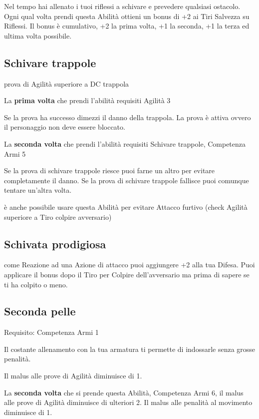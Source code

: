 \documentclass[a4paper,11pt,twoside,openany]{book}
\begin{document}
Nel tempo hai allenato i tuoi riflessi a schivare e prevedere qualsiasi ostacolo. Ogni qual volta prendi questa Abilità ottieni un bonus di +2 ai Tiri Salvezza su Riflessi. Il bonus è cumulativo, +2 la prima volta, +1 la seconda, +1 la terza ed ultima volta possibile.

\subsection{Schivare trappole}

prova di Agilità superiore a DC trappola

La \textbf{prima volta} che prendi l'abilità requisiti Agilità 3

Se la prova ha successo dimezzi il danno della trappola. La prova è attiva ovvero il personaggio non deve essere bloccato.

La \textbf{seconda volta} che prendi l'abilità requisiti Schivare trappole, Competenza Armi 5

Se la prova di schivare trappole riesce puoi farne un altro per evitare completamente il danno. Se la prova di schivare trappole fallisce puoi comunque tentare un'altra volta.

è anche possibile usare questa Abilità per evitare Attacco furtivo (check Agilità superiore a Tiro colpire avversario)

\subsection{Schivata prodigiosa}

come Reazione ad una Azione di attacco puoi aggiungere +2 alla tua Difesa. Puoi applicare il bonus dopo il Tiro per Colpire dell'avversario ma prima di sapere se ti ha colpito o meno.

\subsection{Seconda pelle}

Requisito: Competenza Armi 1

Il costante allenamento con la tua armatura ti permette di indossarle senza grosse penalità.

Il malus alle prove di Agilità diminuisce di 1.

La \textbf{seconda volta} che si prende questa Abilità, Competenza Armi 6, il malus alle prove di Agilità diminuisce di ulteriori 2.
Il malus alle penalità al movimento diminuisce di 1.
\end{document}

